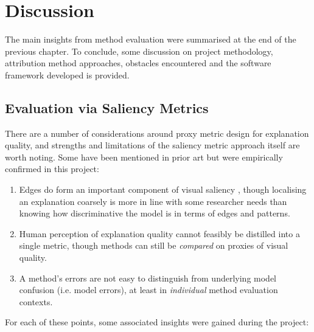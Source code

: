 \documentclass[main]{subfiles}
\begin{document}
\chapter{Discussion}

The main insights from method evaluation were summarised at the end of the previous chapter. To conclude, some discussion on project methodology, attribution method approaches, obstacles encountered and the software framework developed is provided.

\section{Evaluation via Saliency Metrics} \label{sec:eval_via_metrics}

There are a number of considerations around proxy metric design for explanation quality, and strengths and limitations of the saliency metric approach itself are worth noting. Some have been mentioned in prior art but were empirically confirmed in this project:
\begin{enumerate}
\item Edges do form an important component of visual saliency \cite{adebayo}, though localising an explanation coarsely is more in line with some researcher needs than knowing how discriminative the model is in terms of edges and patterns.
\item Human perception of explanation quality cannot feasibly be distilled into a single metric, though methods can still be \textit{compared} on proxies of visual quality.
\item A method's errors are not easy to distinguish from underlying model confusion (i.e. model errors), at least in \textit{individual} method evaluation contexts.

\end{enumerate}

\noindent For each of these points, some associated insights were gained during the project:
\end{document}
